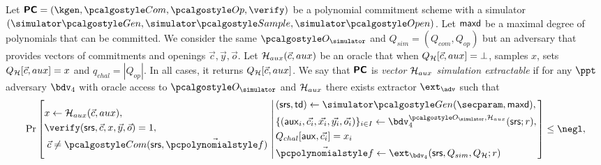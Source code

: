 \documentclass[runningheads,11pt]{llncs}
\let\spvec\vec \let\vec\accentvec
\let\vec\spvec
\begin{document}
\begin{definition}
  \label{def:sepcom}
  \label{def:se_bdv4}
  Let $\PCOM = (\kgen, \com, \open, \verify)$ be a polynomial commitment scheme with
  a simulator $(\simgen, \simsample, \simopen)$. Let $\mathsf{maxd}$ be a maximal degree of
  polynomials that can be committed.  We consider the same $\oracles$ and
  $Q_{sim}= (Q_{com},Q_{op})$ but an adversary that provides vectors of commitments
  and openings $\vec{c}, \vec{y}, \vec{o}$.  Let $\ro_{aux}(\vec{c},aux)$ be an
  oracle that when $Q_{\ro}[\vec{c},aux] = \bot$, samples $x$, sets
  $Q_{\ro}[\vec{c},aux]=x$ and $q_{{chal}}= |Q_{{op}}|$. In all cases, it returns
  $Q_{\ro}[\vec{c},aux]$.  We say that $\bm{\mathsf{PC}}$ is \emph{vector $\mathcal{H}_{aux}$ simulation
    extractable} if for any $\ppt$ adversary $\bdv_4$ with oracle access to
  $\oracles$ and $\mathcal{H}_{aux}$ there exists extractor $\ext_{\adv}$ such that
\[
  \Pr \left[
    \begin{aligned}
      & x \gets \ro_{aux}(\vec{c},aux), \\
      & \verify(\srs, \vec{c}, x, \vec{y}, \vec{o}) = 1, \\
      & \;\vec{c} \neq \com(\srs, \vec{\p{f}})\\
    \end{aligned}
    \,\left|\,
      \vphantom{
        \begin{aligned}
          & \\
          & \\
          & \\
          &
        \end{aligned}
        }
    \begin{aligned}
      & (\srs, \td) \gets \simgen(\secparam, \maxdeg),\\
      & \smallset{(\aux_i, \vec{c_i}, \vec{x_i}, \vec{y_i}, \vec{o_i})}_{i \in I} \gets
      \bdv_4^{\oracles,\ro_{aux}}(\srs; r), \\
      & \Qchal[\aux, \vec{c_i}] = x_i\\
      & \vec{\p{f}} \gets \ext_{\bdv_4}(\srs, Q_{sim}, Q_{\ro}; r)
    \end{aligned}
  \right.\right]
  \leq \negl,
\]
\end{definition}
\end{document}
